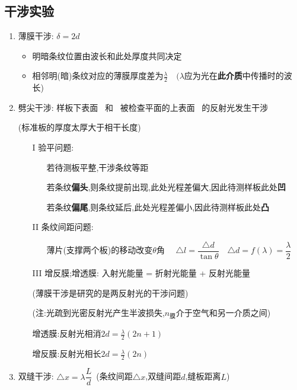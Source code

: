 \documentclass{article}
\begin{document}
\subsection{干涉实验}
\begin{enumerate}[label = (\arabic*{})]
    \item 薄膜干涉: $\delta = 2d$
          \begin{itemize}
              \item 明暗条纹位置由波长和此处厚度共同决定
              \item 相邻明(暗)条纹对应的薄膜厚度差为$\frac{\lambda}{2} \quad (\lambda$应为光在\textbf{此介质}中传播时的波长)
          \end{itemize}
    \item 劈尖干涉: 样板下表面 \, 和 \, 被检查平面的上表面 \, 的反射光发生干涉

          \hspace{5em}(标准板的厚度太厚大于相干长度)

          \begin{itemize}
              \item[I] 验平问题:
                  \begin{itemize}
                      \item[] 若待测板平整,干涉条纹等距
                      \item[] 若条纹\textbf{偏头},则条纹提前出现,此处光程差偏大,因此待测样板此处\textbf{凹}
                      \item[] 若条纹\textbf{偏尾},则条纹延后,此处光程差偏小,因此待测样板此处\textbf{凸}
                  \end{itemize}
              \item[II] 条纹间距问题:
                  \begin{itemize}
                      \item[] 薄片(支撑两个板)的移动改变$\theta$角 $\quad \triangle l = \dfrac{\triangle d}{\tan{\theta}} \quad
                              \triangle d = f(\lambda) = \dfrac{\lambda}{2}$
                  \end{itemize}
              \item[III] 增反膜;增透膜: 入射光能量 = 折射光能量 + 反射光能量

                  \hspace{4em}(薄膜干涉是研究的是两反射光的干涉问题)

                  \hspace{4em}(注:光疏到光密反射光产生半波损失,$n_{\text{膜}}$介于空气和另一介质之间)

                  \hspace{4em}增透膜:反射光相消$2d = \frac{\lambda}{2} (2n+1)$

                  \hspace{4em}增反膜:反射光相长$2d = \frac{\lambda}{2} (2n) $
          \end{itemize}

    \item 双缝干涉: $\triangle x = \lambda \dfrac{L}{d} \,$ (条纹间距$\triangle x $,双缝间距$d$,缝板距离$L$)
\end{enumerate}
\end{document}
